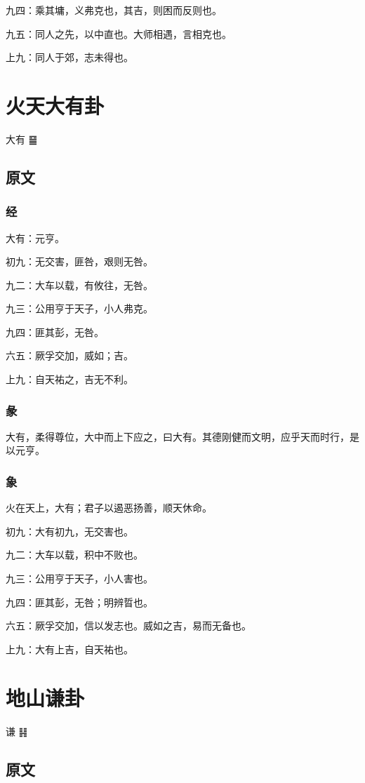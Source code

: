 \documentclass[12pt,oneside]{book}
\begin{document}
九四：乘其墉，义弗克也，其吉，则困而反则也。

九五：同人之先，以中直也。大师相遇，言相克也。

上九：同人于郊，志未得也。


\chapter{火天大有卦}
大有 {\Large ䷍}

\section{原文}

\subsection{经}
大有：元亨。

初九：无交害，匪咎，艰则无咎。

九二：大车以载，有攸往，无咎。

九三：公用亨于天子，小人弗克。

九四：匪其彭，无咎。

六五：厥孚交加，威如；吉。

上九：自天祐之，吉无不利。

\subsection{彖}
大有，柔得尊位，大中而上下应之，曰大有。其德刚健而文明，应乎天而时行，是以元亨。

\subsection{象}
火在天上，大有；君子以遏恶扬善，顺天休命。

初九：大有初九，无交害也。

九二：大车以载，积中不败也。

九三：公用亨于天子，小人害也。

九四：匪其彭，无咎；明辨晢也。

六五：厥孚交加，信以发志也。威如之吉，易而无备也。

上九：大有上吉，自天祐也。


\chapter{地山谦卦}
谦 {\Large ䷎}

\section{原文}
\end{document}
